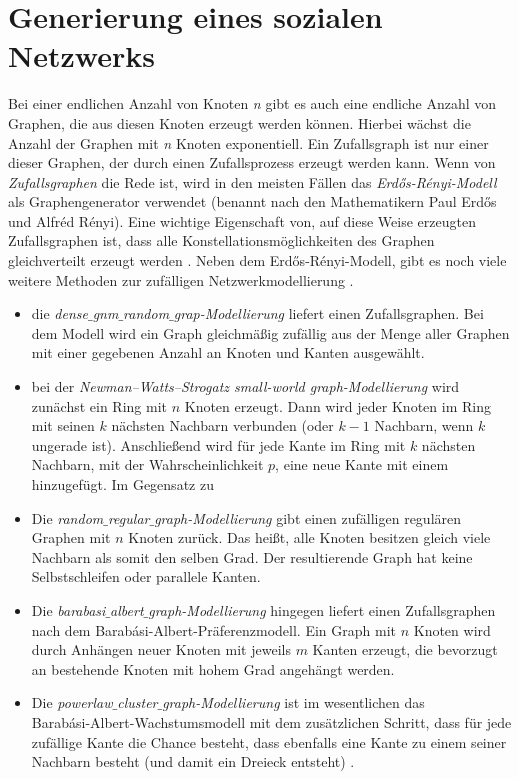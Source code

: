 \section{Generierung eines sozialen Netzwerks} 
Bei einer endlichen Anzahl von Knoten \textit{n} gibt es auch eine endliche Anzahl von Graphen, die aus diesen Knoten erzeugt werden können. Hierbei wächst die Anzahl der Graphen mit \textit{n} Knoten exponentiell.
Ein Zufallsgraph ist nur einer dieser Graphen, der durch einen Zufallsprozess erzeugt werden kann.
Wenn von \textit{Zufallsgraphen} die Rede ist, wird in den meisten Fällen das \textit{Erdős-Rényi-Modell} als Graphengenerator verwendet (benannt nach den Mathematikern Paul Erdős und Alfréd Rényi). Eine wichtige Eigenschaft von, auf diese Weise erzeugten Zufallsgraphen ist, dass alle Konstellationsmöglichkeiten des Graphen gleichverteilt erzeugt werden \cite{Generators}.
Neben dem Erdős-Rényi-Modell, gibt es noch viele weitere Methoden zur zufälligen Netzwerkmodellierung \cite{Generators}.
\begin{itemize}
    \item die \textit{dense$\_$gnm$\_$random$\_$grap-Modellierung} liefert einen Zufallsgraphen.
    Bei dem Modell wird ein Graph gleichmäßig zufällig aus der Menge aller Graphen mit einer gegebenen Anzahl an Knoten und Kanten ausgewählt.
    \item bei der \textit{Newman–Watts–Strogatz small-world graph-Modellierung} wird zunächst ein Ring mit $n$ Knoten erzeugt. Dann wird jeder Knoten im Ring mit seinen $k$ nächsten Nachbarn verbunden (oder $k - 1$ Nachbarn, wenn $k$ ungerade ist). Anschließend wird für jede Kante im Ring mit $k$ nächsten Nachbarn, mit der Wahrscheinlichkeit $p$, eine neue Kante mit einem hinzugefügt. Im Gegensatz zu 
    \item Die \textit{random$\_$regular$\_$graph-Modellierung} gibt einen zufälligen regulären Graphen mit $n$ Knoten zurück. Das heißt, alle Knoten besitzen gleich viele Nachbarn als somit den selben Grad.
    Der resultierende Graph hat keine Selbstschleifen oder parallele Kanten.
    \item Die \textit{barabasi$\_$albert$\_$graph-Modellierung} hingegen liefert einen Zufallsgraphen nach dem Barabási-Albert-Präferenzmodell.
    Ein Graph mit $n$ Knoten wird durch Anhängen neuer Knoten mit jeweils $m$ Kanten erzeugt, die bevorzugt an bestehende Knoten mit hohem Grad angehängt werden.
    \item Die \textit{powerlaw$\_$cluster$\_$graph-Modellierung} ist im wesentlichen das\\ Barabási-Albert-Wachstumsmodell mit dem zusätzlichen Schritt, dass für jede zufällige Kante die Chance besteht, dass ebenfalls eine Kante zu einem seiner Nachbarn besteht (und damit ein Dreieck entsteht) \cite{Generators}.
\end{itemize}

